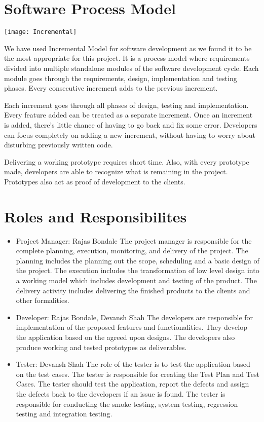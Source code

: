 \documentclass[12pt, letterpaper, twoside]{report}
\begin{document}
\section{Software Process Model}
\texttt{[image: Incremental]}
\par \LARGE{We have used Incremental Model for software development as we found it to be the most appropriate for this project. It is a process model where requirements divided into multiple standalone modules of the software development cycle. Each module goes through the requirements, design, implementation and testing phases. Every consecutive increment adds to the previous increment. 
\par Each increment goes through all phases of design, testing and implementation. Every feature added can be treated as a separate increment. Once an increment is added, there's little chance of having to go back and fix some error. Developers can focus completely on adding a new increment, without having to worry about disturbing previously written code. 
\par Delivering a working prototype requires short time. Also, with every prototype made, developers are able to recognize what is remaining in the project. Prototypes also act as proof of development to the clients. }
\section{Roles and Responsibilites}
\LARGE{
\begin{itemize}
\item Project Manager: Rajas Bondale
The project manager is responsible for the complete planning, execution, monitoring, and delivery of the project. The planning includes the planning out the scope, scheduling and a basic design of the project. The execution includes the transformation of low level design into a working model which includes development and testing of the product. The delivery activity includes delivering the finished products to the clients and other formalities.
\item Developer: Rajas Bondale, Devansh Shah
The developers are responsible for implementation of the proposed features and functionalities. They develop the application based on the agreed upon designs. The developers also produce working and tested prototypes as deliverables. 
\item Tester: Devansh Shah
The role of the tester is to test the application based on the test cases. The tester is responsible for creating the Test Plan and Test Cases. The tester should test the application, report the defects and assign the defects back to the developers if an issue is found. The tester is responsible for conducting the smoke testing, system testing, regression testing and integration testing.
\end{itemize}}
\end{document}
